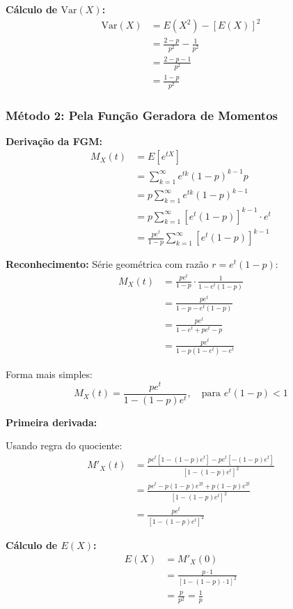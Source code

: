 \documentclass[12pt,a4paper]{article}
\theoremstyle{plain}
\theoremstyle{definition}
\theoremstyle{remark}
\begin{document}
\textbf{Cálculo de \(\text{Var}(X)\):}
\begin{align}
\text{Var}(X) &= E(X^2) - [E(X)]^2 \\
&= \frac{2-p}{p^2} - \frac{1}{p^2} \\
&= \frac{2-p-1}{p^2} \\
&= \frac{1-p}{p^2}
\end{align}

\subsubsection{Método 2: Pela Função Geradora de Momentos}

\textbf{Derivação da FGM:}
\begin{align}
M_X(t) &= E[e^{tX}] \\
&= \sum_{k=1}^{\infty} e^{tk} (1-p)^{k-1} p \\
&= p \sum_{k=1}^{\infty} e^{tk} (1-p)^{k-1} \\
&= p \sum_{k=1}^{\infty} [e^t(1-p)]^{k-1} \cdot e^t \\
&= \frac{pe^t}{1-p} \sum_{k=1}^{\infty} [e^t(1-p)]^{k-1}
\end{align}

\textbf{Reconhecimento:} Série geométrica com razão \(r = e^t(1-p)\):
\begin{align}
M_X(t) &= \frac{pe^t}{1-p} \cdot \frac{1}{1 - e^t(1-p)} \\
&= \frac{pe^t}{1-p - e^t(1-p)} \\
&= \frac{pe^t}{1 - e^t + pe^t - p} \\
&= \frac{pe^t}{1-p(1-e^t) - e^t} 
\end{align}

Forma mais simples:
\[
M_X(t) = \frac{pe^t}{1 - (1-p)e^t}, \quad \text{para } e^t(1-p) < 1
\]

\textbf{Primeira derivada:}

Usando regra do quociente:
\begin{align}
M'_X(t) &= \frac{pe^t[1-(1-p)e^t] - pe^t[-(1-p)e^t]}{[1-(1-p)e^t]^2} \\
&= \frac{pe^t - p(1-p)e^{2t} + p(1-p)e^{2t}}{[1-(1-p)e^t]^2} \\
&= \frac{pe^t}{[1-(1-p)e^t]^2}
\end{align}

\textbf{Cálculo de \(E(X)\):}
\begin{align}
E(X) &= M'_X(0) \\
&= \frac{p \cdot 1}{[1-(1-p) \cdot 1]^2} \\
&= \frac{p}{p^2} = \frac{1}{p}
\end{align}
\end{document}
